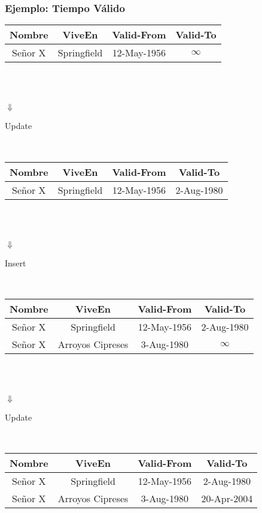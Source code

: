 \documentclass[12pt]{beamer}
\begin{document}
\begin{frame}
\frametitle{Ejemplo: Tiempo V\'alido}
\begin{center}
\begin{tabular}{|c|c|c|c|}
\hline
Nombre & ViveEn & Valid-From & Valid-To\\
\hline
Se\~nor X & Springfield & 12-May-1956 & $\infty$\\
\hline
\end{tabular}
\\
\ \\
\begin{Huge}{$\Downarrow$}\end{Huge}\begin{small}{Update}\end{small}\\
\begin{tabular}{|c|c|c|c|}
\hline
Nombre & ViveEn & Valid-From & Valid-To\\
\hline
Se\~nor X & Springfield & 12-May-1956 & 2-Aug-1980\\
\hline
\end{tabular}
\\
\ \\
\begin{Huge}{$\Downarrow$}\end{Huge}\begin{small}{Insert}\end{small}\\
\begin{tabular}{|c|c|c|c|}
\hline
Nombre & ViveEn & Valid-From & Valid-To\\
\hline
Se\~nor X & Springfield & 12-May-1956 & 2-Aug-1980\\
\hline
Se\~nor X & Arroyos Cipreses & 3-Aug-1980 & $\infty$\\
\hline
\end{tabular}
\\
\ \\
\begin{Huge}{$\Downarrow$}\end{Huge}\begin{small}{Update}\end{small}\\
\begin{tabular}{|c|c|c|c|}
\hline
Nombre & ViveEn & Valid-From & Valid-To\\
\hline
Se\~nor X & Springfield & 12-May-1956 & 2-Aug-1980\\
\hline
Se\~nor X & Arroyos Cipreses & 3-Aug-1980 & 20-Apr-2004\\
\hline
\end{tabular}

\end{center}
\end{frame}
\end{document}

